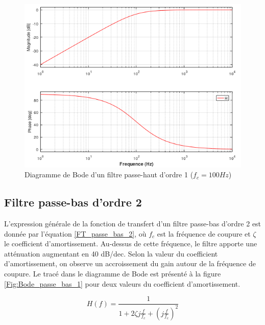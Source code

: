 	\begin{figure}[h!]
		\centering
		\includegraphics[scale=0.7]{images/Bode_passe_haut_1.png}
		\caption{Diagramme de Bode d'un filtre passe-haut d'ordre 1 ($f_{c}=100 Hz$)}	
		\label{Fig:Bode_passe_haut_1} 
	\end{figure}

	
	\subsection{Filtre passe-bas d'ordre 2}
	
	L'expression générale de la fonction de transfert d'un filtre passe-bas d'ordre 2 est donnée par l'équation \ref{FT_passe_bas_2}, où $f_{c}$ est la fréquence de coupure et $\zeta$ le coefficient d'amortissement. Au-dessus de cette fréquence, le filtre apporte une atténuation augmentant en 40 dB/dec. Selon la valeur du coefficient d'amortissement, on observe un accroissement du gain autour de la fréquence de coupure. Le tracé dans le diagramme de Bode est présenté à la figure \ref{Fig:Bode_passe_bas_1} pour deux valeurs du coefficient d'amortissement.
	
	
	\begin{equation}\label{FT_passe_bas_2}
	H(f) = \frac{1}{1+2\zeta j\frac{f}{f_{c}}+(j\frac{f}{f_{c}})^{2}}
	\end{equation}

